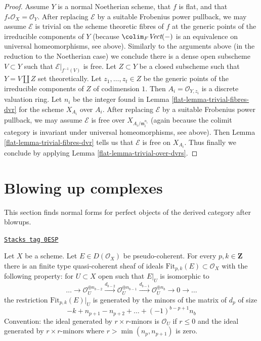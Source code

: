 \begin{proof}
\medskip\noindent
Assume $Y$ is a normal Noetherian scheme, that $f$ is flat, and
that $f_*\mathcal{O}_X = \mathcal{O}_Y$. After replacing $\mathcal{E}$
by a suitable Frobenius power pullback, we may assume $\mathcal{E}$
is trivial on the scheme theoretic fibres of $f$ at the generic points
of the irreducible components of $Y$ (because
$\colim_F \textit{Vect}(-)$ is an equivalence on universal
homeomorphisms, see above). Similarly to the arguments above
(in the reduction to the Noetherian case) we conclude there is a dense
open subscheme $V \subset Y$ such that $\mathcal{E}|_{f^{-1}(V)}$ is free.
Let $Z \subset Y$ be a closed subscheme such that
$Y = V \amalg Z$ set theoretically. Let $z_1, \ldots, z_t \in Z$
be the generic points of the irreducible components of $Z$
of codimension $1$. Then $A_i = \mathcal{O}_{Y, z_i}$ is
a discrete valuation ring. Let $n_i$ be the integer found in
Lemma \ref{flat-lemma-trivial-fibres-dvr} for the scheme $X_{A_i}$ over $A_i$.
After replacing $\mathcal{E}$ by a suitable Frobenius
power pullback, we may assume $\mathcal{E}$ is free over
$X_{A_i/\mathfrak m_i^{n_i}}$ (again because the colimit category
is invariant under universal homeomorphisms, see above).
Then Lemma \ref{flat-lemma-trivial-fibres-dvr} tells us that
$\mathcal{E}$ is free on $X_{A_i}$.
Thus finally we conclude by applying Lemma \ref{flat-lemma-trivial-over-dvrs}.
\end{proof}

\section{Blowing up complexes}
\label{flat-section-blowup-complexes}
This section finds normal forms for perfect objects of the derived category
after blowups.

\begin{lemma}
\label{flat-lemma-fitting-ideals-complex}
\href{https://stacks.math.columbia.edu/tag/0ESP}{\texttt{Stacks tag 0ESP}}

Let $X$ be a scheme. Let $E \in D(\mathcal{O}_X)$ be pseudo-coherent.
For every $p, k \in \mathbf{Z}$ there is an finite type quasi-coherent
sheaf of ideals $\text{Fit}_{p, k}(E) \subset \mathcal{O}_X$
with the following property: for $U \subset X$ open
such that $E|_U$ is isomorphic to
$$
\ldots \to
\mathcal{O}_U^{\oplus n_{b - 2}}
\xrightarrow{d_{b - 2}}
\mathcal{O}_U^{\oplus n_{b - 1}}
\xrightarrow{d_{b - 1}}
\mathcal{O}_U^{\oplus n_b} \to 0 \to \ldots
$$
the restriction $\text{Fit}_{p, k}(E)|_U$ is generated by the
minors of the matrix of $d_p$ of size
$$
- k + n_{p + 1} - n_{p + 2} + \ldots + (-1)^{b - p + 1} n_b
$$
Convention: the ideal generated by $r \times r$-minors
is $\mathcal{O}_U$ if $r \leq 0$ and the ideal generated by
$r \times r$-minors where $r > \min(n_p, n_{p + 1})$ is zero.
\end{lemma}

